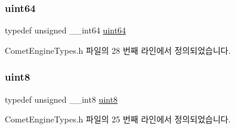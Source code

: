 \mbox{\label{namespace_comet_engine_1_1_type_ac6afe794ed283c11fb63426a58188e5e}} 
\subsubsection{\texorpdfstring{uint64}{uint64}}
{\footnotesize\ttfamily typedef unsigned \+\_\+\+\_\+int64 \hyperlink{namespace_comet_engine_1_1_type_ac6afe794ed283c11fb63426a58188e5e}{uint64}}



Comet\+Engine\+Types.\+h 파일의 28 번째 라인에서 정의되었습니다.

\mbox{\label{namespace_comet_engine_1_1_type_a1b09856a6463f2bcc4bd8ff0e4e3ee0f}} 
\subsubsection{\texorpdfstring{uint8}{uint8}}
{\footnotesize\ttfamily typedef unsigned \+\_\+\+\_\+int8 \hyperlink{namespace_comet_engine_1_1_type_a1b09856a6463f2bcc4bd8ff0e4e3ee0f}{uint8}}



Comet\+Engine\+Types.\+h 파일의 25 번째 라인에서 정의되었습니다.

